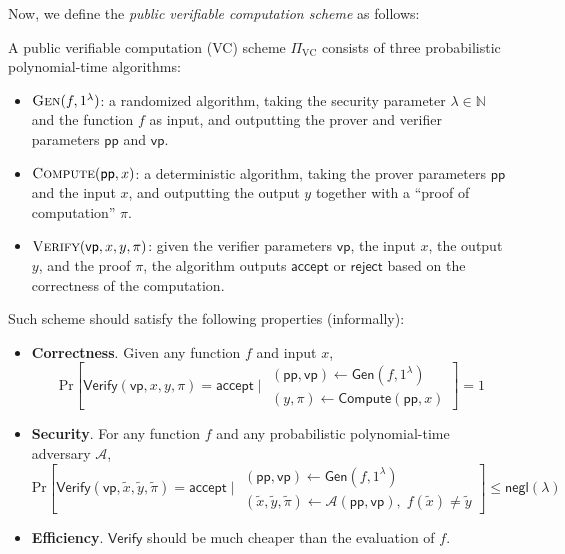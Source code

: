 \documentclass{iacrtrans}
\begin{document}
Now, we define the \textit{public verifiable computation scheme} as follows:
\begin{definition}
  A public verifiable computation (VC) scheme $\Pi_{\text{VC}}$ consists of three probabilistic polynomial-time algorithms:
  \begin{itemize}
    \item $\textsc{Gen}(f,1^{\lambda})$: a randomized algorithm, taking the
    security parameter $\lambda \in \mathbb{N}$ and the function $f$ as input,
    and outputting the prover and verifier parameters $\mathsf{pp}$ and
    $\mathsf{vp}$.
    \item $\textsc{Compute}(\mathsf{pp}, x)$: a deterministic algorithm, taking
    the prover parameters $\mathsf{pp}$ and the input $x$, and outputting the
    output $y$ together with a ``proof of computation'' $\pi$.
    \item $\textsc{Verify}(\mathsf{vp}, x, y, \pi)$: given the verifier
    parameters $\mathsf{vp}$, the input $x$, the output $y$, and the proof
    $\pi$, the algorithm outputs $\mathsf{accept}$ or $\mathsf{reject}$ based on
    the correctness of the computation.
  \end{itemize}

  Such scheme should satisfy the following properties (informally):
  \begin{itemize}
    \item \textbf{Correctness}. Given any function $f$ and input $x$,
    \begin{equation*}
      \text{Pr}\left[\mathsf{Verify}(\mathsf{vp}, x, y, \pi) = \mathsf{accept}\; \Big| \; \begin{matrix}
        (\mathsf{pp},\mathsf{vp}) \gets \mathsf{Gen}(f,1^{\lambda}) \\
        (y,\pi) \gets \mathsf{Compute}(\mathsf{pp},x)
      \end{matrix}\right] = 1
    \end{equation*}
    \item \textbf{Security}. For any function $f$ and any probabilistic
    polynomial-time adversary $\mathcal{A}$, 
    \begin{equation*}
      \text{Pr}\left[\mathsf{Verify}(\mathsf{vp}, \widetilde{x}, \widetilde{y}, \widetilde{\pi}) = \mathsf{accept}\; \Big| \; \begin{matrix}
        (\mathsf{pp},\mathsf{vp}) \gets \mathsf{Gen}(f,1^{\lambda}) \\
        (\widetilde{x}, \widetilde{y}, \widetilde{\pi}) \gets \mathcal{A}(\mathsf{pp}, \mathsf{vp}), \; f(\widetilde{x}) \neq \widetilde{y}
      \end{matrix}\right] \leq \mathsf{negl}(\lambda)
    \end{equation*}
    \item \textbf{Efficiency}. $\mathsf{Verify}$ should be much cheaper than the
    evaluation of $f$.
  \end{itemize}
\end{definition}
\end{document}
